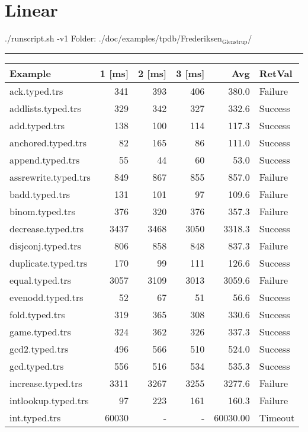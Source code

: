 \documentclass[11pt]{article}
\author{Manuel Schneckenreither}
\date{\today}
\title{}
\begin{document}
\tableofcontents

\section{Linear}
\label{sec:org7ab2df8}

./runscript.sh -v1
Folder: ./doc/examples/tpdb/Frederiksen\(_{\text{Glenstrup}}\)/

\rule{\linewidth}{0.5pt}

\begin{center}
\begin{tabular}{lrrrrl}
Example & 1 [ms] & 2 [ms] & 3 [ms] & Avg & RetVal\\
\hline
ack.typed.trs & 341 & 393 & 406 & 380.0 & Failure\\
addlists.typed.trs & 329 & 342 & 327 & 332.6 & Success\\
add.typed.trs & 138 & 100 & 114 & 117.3 & Success\\
anchored.typed.trs & 82 & 165 & 86 & 111.0 & Success\\
append.typed.trs & 55 & 44 & 60 & 53.0 & Success\\
assrewrite.typed.trs & 849 & 867 & 855 & 857.0 & Failure\\
badd.typed.trs & 131 & 101 & 97 & 109.6 & Failure\\
binom.typed.trs & 376 & 320 & 376 & 357.3 & Failure\\
decrease.typed.trs & 3437 & 3468 & 3050 & 3318.3 & Success\\
disjconj.typed.trs & 806 & 858 & 848 & 837.3 & Failure\\
duplicate.typed.trs & 170 & 99 & 111 & 126.6 & Success\\
equal.typed.trs & 3057 & 3109 & 3013 & 3059.6 & Failure\\
evenodd.typed.trs & 52 & 67 & 51 & 56.6 & Success\\
fold.typed.trs & 319 & 365 & 308 & 330.6 & Success\\
game.typed.trs & 324 & 362 & 326 & 337.3 & Success\\
gcd2.typed.trs & 496 & 566 & 510 & 524.0 & Success\\
gcd.typed.trs & 556 & 516 & 534 & 535.3 & Success\\
increase.typed.trs & 3311 & 3267 & 3255 & 3277.6 & Failure\\
intlookup.typed.trs & 97 & 223 & 161 & 160.3 & Failure\\
int.typed.trs & 60030 & - & - & 60030.00 & Timeout\\

\end{tabular}
\end{center}
\end{document}
